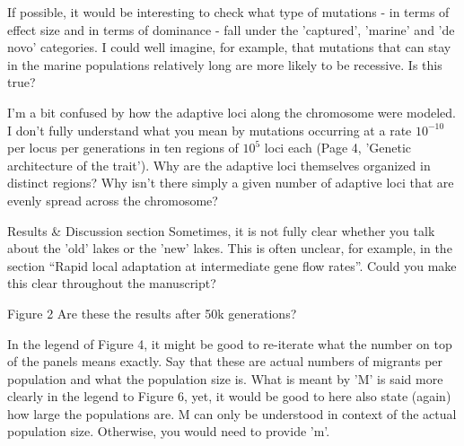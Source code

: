 \reply{
}

\begin{point}{}
If possible, it would be interesting to check what type of mutations - in terms of effect size and in terms of dominance - fall under the 'captured', 'marine' and 'de novo' categories. I could well imagine, for example, that mutations that can stay in the marine populations relatively long are more likely to be recessive. Is this true?
\end{point}

\reply{
}

\begin{point}{}
I'm a bit confused by how the adaptive loci along the chromosome were modeled. I don't fully understand what you mean by mutations occurring at a rate $10^{-10}$ per locus per generations in ten regions of $10^5$ loci each (Page 4, 'Genetic architecture of the trait'). Why are the adaptive loci themselves organized in distinct regions? Why isn't there simply a given number of adaptive loci that are evenly spread across the chromosome?
\end{point}

\reply{
}

\begin{point}{Results \& Discussion section}
    Sometimes, it is not fully clear whether you talk about the 'old' lakes or the 'new' lakes. This is often unclear, for example, in the section ``Rapid local adaptation at intermediate gene flow rates''. Could you make this clear throughout the manuscript?
\end{point}

\reply{
}

\begin{point}{Figure 2}
    Are these the results after 50k generations?
\end{point}

\reply{
}

\begin{point}{}
    In the legend of Figure 4, it might be good to re-iterate what the number on top of the panels means exactly. Say that these are actual numbers of migrants per population and what the population size is. What is meant by 'M' is said more clearly in the legend to Figure 6, yet, it would be good to here also state (again) how large the populations are. M can only be understood in context of the actual population size. Otherwise, you would need to provide 'm'.
\end{point}

\reply{
}

